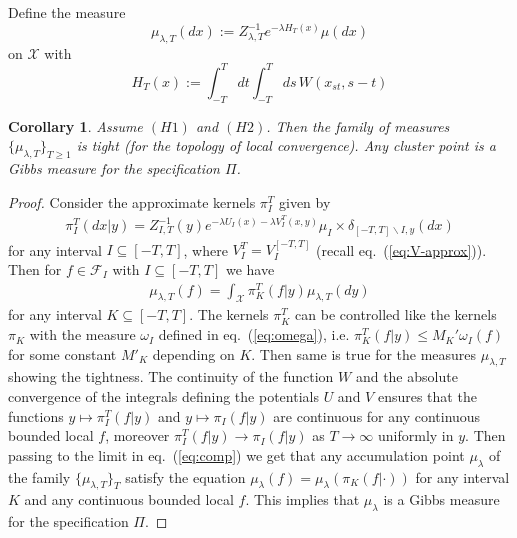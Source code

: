 \documentclass[a4paper,12pt,reqno]{amsart}
\newtheorem{corollary}[theorem]{Corollary}
\newcommand{\X}{\mathcal{X}}
\newcommand{\F}{\mathcal{F}}
\begin{document}

Define the measure
\begin{equation}
\mu_{\lambda,T}(dx) := Z_{\lambda,T}^{-1} e^{-\lambda H_T(x)} \mu(dx)   
\end{equation}
on $\X$
with
$$
H_T(x) := \int_{-T}^T dt \int_{-T}^T ds \, W(x_{st},s-t)
$$



\begin{corollary}
\label{prop:tight}
Assume $(H1)$ and $(H2)$. Then
the family of measures $\{\mu_{\lambda,T} \}_{T \ge 1}$ is tight (for
the topology of local convergence). Any cluster point is a Gibbs
measure for the specification $\Pi$.
\end{corollary}
\begin{proof}
Consider the approximate kernels $\pi^T_I$ given by
\begin{equation}
  \begin{split}
\pi^T_I(dx|y) = Z_{I,T}^{-1}(y) e^{-\lambda U_{I}(x) -\lambda V^T_{I}(x,y)} \mu_I\times \delta_{[-T,T]\backslash I,y}(dx)   
  \end{split}
\end{equation}
for any interval $I \subseteq[-T,T]$, where $V^T_I = V_I^{[-T,T]}$ (recall eq.~(\ref{eq:V-approx})). Then for $f \in \F_I$  with $I \subseteq [-T,T]$ we have
\begin{equation}
\label{eq:comp}
  \begin{split}
\mu_{\lambda,T}(f) = \int_{\X}  \pi^T_K(f|y)  \mu_{\lambda,T}(dy)    
  \end{split}
\end{equation}
for any interval $K \subseteq [-T,T]$.
The kernels $\pi^T_K$ can be controlled like the kernels $\pi_K$  with the measure $\omega_I$ defined in eq.~(\ref{eq:omega}), i.e. $\pi^T_K(f|y) \le M_K' \omega_I(f)$ for some constant $M'_K$ depending on $K$. Then same is  true for the measures $\mu_{\lambda,T}$  showing the tightness. The continuity of the function $W$ and the absolute convergence of the integrals defining the potentials $U$ and $V$ ensures that the functions $y \mapsto \pi_I^T(f|y)$ and $y \mapsto \pi_I(f|y)$ are continuous for any continuous bounded local $f$, moreover $\pi_I^T(f|y) \to \pi_I(f|y)$ as $T \to \infty$ uniformly in $y$. Then passing to the limit in eq.~(\ref{eq:comp})  we get that any accumulation point $\mu_\lambda$ of the family $\{\mu_{\lambda,T}\}_T$ satisfy the equation $\mu_\lambda(f) = \mu_\lambda (\pi_{K}(f|\cdot))$ for any interval $K$ and any continuous bounded local $f$. This implies that $\mu_\lambda$ is a Gibbs measure for the specification $\Pi$.
\end{proof}
\end{document}
